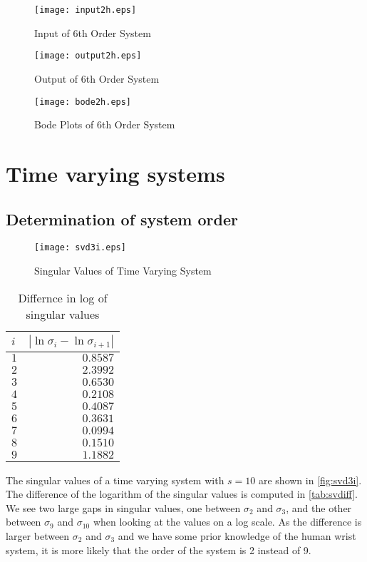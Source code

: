 \documentclass[11pt,a4paper]{article}
\begin{document}
\begin{figure}
    \centering
    \texttt{[image: input2h.eps]}
    \caption{Input of 6th Order System}
    \label{fig:input2h}
\end{figure}
\begin{figure}
    \centering
    \texttt{[image: output2h.eps]}
    \caption{Output of 6th Order System}
    \label{fig:output2h}
\end{figure}
\begin{figure}
    \centering
    \texttt{[image: bode2h.eps]}
    \caption{Bode Plots of 6th Order System}
    \label{fig:bode2h}
\end{figure}

\section{Time varying systems}

\subsection{Determination of system order}
\begin{figure}
    \centering
    \texttt{[image: svd3i.eps]}
    \caption{Singular Values of Time Varying System}
    \label{fig:svd3i}
\end{figure}
\begin{table}
    \centering
    \begin{tabular}{|l|r|}
        \hline
        $i$ & $ |\ln \sigma_i - \ln \sigma_{i + 1}|$ \\
        \hline
        $ 1 $ & $ 0.8587 $ \\
        $ 2 $ & $ 2.3992 $ \\
        $ 3 $ & $ 0.6530 $ \\
        $ 4 $ & $ 0.2108 $ \\
        $ 5 $ & $ 0.4087 $ \\
        $ 6 $ & $ 0.3631 $ \\
        $ 7 $ & $ 0.0994 $ \\
        $ 8 $ & $ 0.1510 $ \\
        $ 9 $ & $ 1.1882 $ \\
        \hline
    \end{tabular}
    \caption{Differnce in log of singular values}
    \label{tab:svdiff}
\end{table}
The singular values of a time varying system with $s = 10$ are shown in
\autoref{fig:svd3i}. The difference of the logarithm of the singular values is
computed in \autoref{tab:svdiff}. We see two large gaps in singular values, one
between $\sigma_2$ and $\sigma_3$, and the other between $\sigma_9$ and
$\sigma_{10}$ when looking at the values on a log scale. As the difference is
larger between $\sigma_2$ and $\sigma_3$ and we have some prior knowledge of
the human wrist system, it is more likely that the order of the system is 2
instead of 9.
\end{document}
